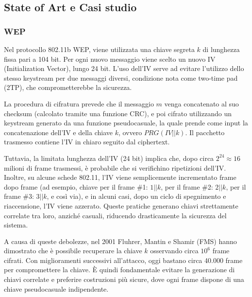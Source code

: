 \documentclass{report}
\begin{document}
\subsection{State of Art e Casi studio}
    \subsubsection{WEP}
    Nel protocollo 802.11b WEP, viene utilizzata una chiave segreta $k$ di lunghezza fissa pari a 104 bit. Per ogni nuovo messaggio viene scelto un nuovo IV (Initialization Vector), lungo 24 bit. L'uso dell'IV serve ad evitare l'utilizzo dello stesso keystream per due messaggi diversi, condizione nota come two-time pad (2TP), che comprometterebbe la sicurezza.

La procedura di cifratura prevede che il messaggio $m$ venga concatenato al suo checksum (calcolato tramite una funzione CRC), e poi cifrato utilizzando un keystream generato da una funzione pseudocasuale, la quale prende come input la concatenazione dell'IV e della chiave $k$, ovvero $PRG(IV || k)$. Il pacchetto trasmesso contiene l'IV in chiaro seguito dal ciphertext.

Tuttavia, la limitata lunghezza dell'IV (24 bit) implica che, dopo circa $2^{24} \approx 16$ milioni di frame trasmessi, è probabile che si verifichino ripetizioni dell'IV. Inoltre, su alcune schede 802.11, l'IV viene semplicemente incrementato frame dopo frame (ad esempio, chiave per il frame \#1: $1||k$, per il frame \#2: $2||k$, per il frame \#3: $3||k$, e così via), e in alcuni casi, dopo un ciclo di spegnimento e riaccensione, l'IV viene azzerato. Queste pratiche generano chiavi strettamente correlate tra loro, anziché casuali, riducendo drasticamente la sicurezza del sistema.

A causa di queste debolezze, nel 2001 Fluhrer, Mantin e Shamir (FMS) hanno dimostrato che è possibile recuperare la chiave $k$ osservando circa $10^6$ frame cifrati. Con miglioramenti successivi all'attacco, oggi bastano circa 40.000 frame per compromettere la chiave. È quindi fondamentale evitare la generazione di chiavi correlate e preferire costruzioni più sicure, dove ogni frame dispone di una chiave pseudocasuale indipendente.
\end{document}
